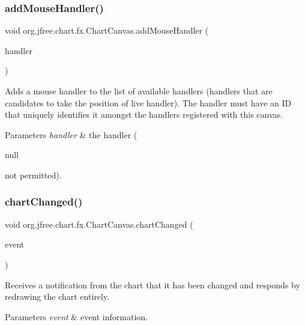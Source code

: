 \subsubsection{\texorpdfstring{add\+Mouse\+Handler()}{addMouseHandler()}}
{\footnotesize\ttfamily void org.\+jfree.\+chart.\+fx.\+Chart\+Canvas.\+add\+Mouse\+Handler (\begin{DoxyParamCaption}\item[{\mbox{\hyperlink{interfaceorg_1_1jfree_1_1chart_1_1fx_1_1interaction_1_1_mouse_handler_f_x}{Mouse\+Handler\+FX}}}]{handler }\end{DoxyParamCaption})}

Adds a mouse handler to the list of available handlers (handlers that are candidates to take the position of live handler). The handler must have an ID that uniquely identifies it amongst the handlers registered with this canvas.


\begin{DoxyParams}{Parameters}
{\em handler} & the handler (
\begin{DoxyCode}
null 
\end{DoxyCode}
 not permitted). \\
\hline
\end{DoxyParams}
\mbox{\label{classorg_1_1jfree_1_1chart_1_1fx_1_1_chart_canvas_aada7d718977d4674bdf59d0e7c2f03e8}} 
\subsubsection{\texorpdfstring{chart\+Changed()}{chartChanged()}}
{\footnotesize\ttfamily void org.\+jfree.\+chart.\+fx.\+Chart\+Canvas.\+chart\+Changed (\begin{DoxyParamCaption}\item[{\mbox{\hyperlink{classorg_1_1jfree_1_1chart_1_1event_1_1_chart_change_event}{Chart\+Change\+Event}}}]{event }\end{DoxyParamCaption})}

Receives a notification from the chart that it has been changed and responds by redrawing the chart entirely.


\begin{DoxyParams}{Parameters}
{\em event} & event information. \\
\hline
\end{DoxyParams}


